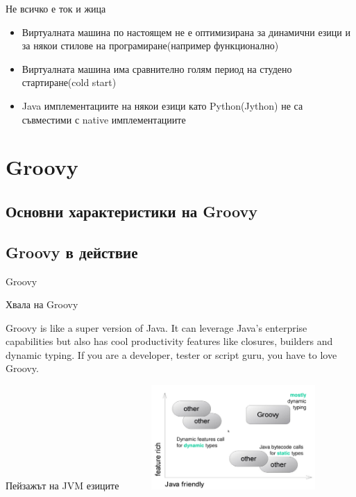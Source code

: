 \documentclass[compress,red]{beamer}
\begin{document}
\begin{frame}{Не всичко е ток и жица}
  \transdissolve
  \begin{itemize}
  \item Виртуалната машина по настоящем не е оптимизирана за динамични
    езици и за някои стилове на програмиране(например функционално) \pause
  \item Виртуалната машина има сравнително голям период на
    студено стартиране(cold start) \pause
  \item Java имплементациите на някои езици като Python(Jython) не са
    съвместими с native имплементациите
  \end{itemize}
\end{frame}

\section{Groovy}
\subsection{Основни характеристики на Groovy}
\subsection{Groovy в действие}

\begin{frame}{Groovy}
  \transdissolve
  \begin{center}
    \begin{block}{Хвала на Groovy} 
    \begin{center}Groovy is like a super version of Java. It can leverage
   Java's enterprise capabilities but also has cool productivity
   features like closures, builders and dynamic typing. If you are a
   developer, tester or script guru, you have to love Groovy.
  \end{center}
  \end{block}
  \end{center}
\end{frame}

\begin{frame}{Пейзажът на JVM езиците}
  \transdissolve
  \includegraphics[width=320px, height=150px]{images/landscape.png}
\end{frame}
\end{document}
